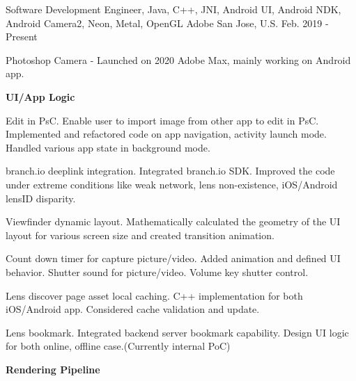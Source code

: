 


\begin{cventries}



\cventry
{Software Development Engineer, Java, C++, JNI, Android UI, Android NDK, Android Camera2, Neon, Metal, OpenGL} %
{Adobe} %
{San Jose, U.S.} %
{Feb. 2019 - Present} %
{ %
\begin{cvitems}
{\setlength\itemindent{-2ex} \item[] {Photoshop Camera - Launched on 2020 Adobe Max, mainly working on Android app.}}
\item[] {}
{\setlength\itemindent{-2ex} \item[] \textbf{UI/App Logic}}
\item {Edit in PsC. Enable user to import image from other app to edit in PsC. Implemented and refactored code on app navigation, activity launch mode. Handled various app state in background mode.}
\item {branch.io deeplink integration. Integrated branch.io SDK. Improved the code under extreme conditions like weak network, lens non-existence, iOS/Android lensID disparity.}
\item {Viewfinder dynamic layout. Mathematically calculated the geometry of the UI layout for various screen size and created transition animation.}
\item {Count down timer for capture picture/video. Added animation and defined UI behavior. Shutter sound for picture/video. Volume key shutter control.}
\item {Lens discover page asset local caching. C++ implementation for both iOS/Android app. Considered cache validation and update.}
\item {Lens bookmark. Integrated backend server bookmark capability. Design UI logic for both online, offline case.(Currently internal PoC)}
{\setlength\itemindent{-2ex} \item[] \textbf{Rendering Pipeline}}

\end{cvitems}}
\end{cventries}
